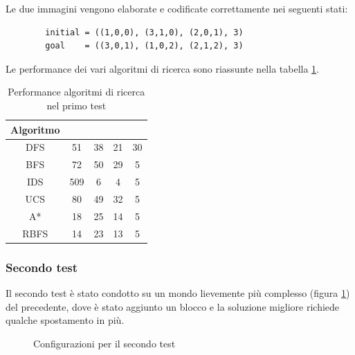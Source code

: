 \documentclass{article}
\begin{document}
	\noindent Le due immagini vengono elaborate e codificate correttamente nei seguenti stati:
	\begin{verbatim}
		initial = ((1,0,0), (3,1,0), (2,0,1), 3)
		goal    = ((3,0,1), (1,0,2), (2,1,2), 3)
	\end{verbatim}
	Le performance dei vari algoritmi di ricerca sono riassunte nella tabella \ref{tab:exp1}.
	\begin{table}[H]
		\centering
		\def\arraystretch{1.5}
		\begin{tabular}{|c|c|c|c|c|}
			\hline
			\textbf{Algoritmo} & \bm{$n$} & \bm{$m$} & \bm{$\mu$} & \bm{$l$} \\
			\hline
			DFS &  51 & 38 & 21 & 30 \\
			\hline
			BFS &  72 & 50 & 29 & 5 \\
			\hline
			IDS &  509 & 6 & 4 & 5 \\
			\hline
			UCS &  80 & 49 & 32 & 5 \\
			\hline
			A* &  18 & 25 & 14 & 5 \\
			\hline
			RBFS &  14 & 23 & 13 & 5 \\
			\hline
			
		\end{tabular}
		\caption{Performance algoritmi di ricerca nel primo test}
		\label{tab:exp1}
	\end{table}
	
	
	\subsubsection{Secondo test}
	Il secondo test è stato condotto su un mondo lievemente più complesso (figura \ref{fig:exp2}) del precedente, dove è stato aggiunto un blocco e la soluzione migliore richiede qualche spostamento in più.
	\begin{figure}[H]
		\centering
		\protect\caption{Configurazioni per il secondo test}
		\label{fig:exp2}
	\end{figure}
	
\end{document}
